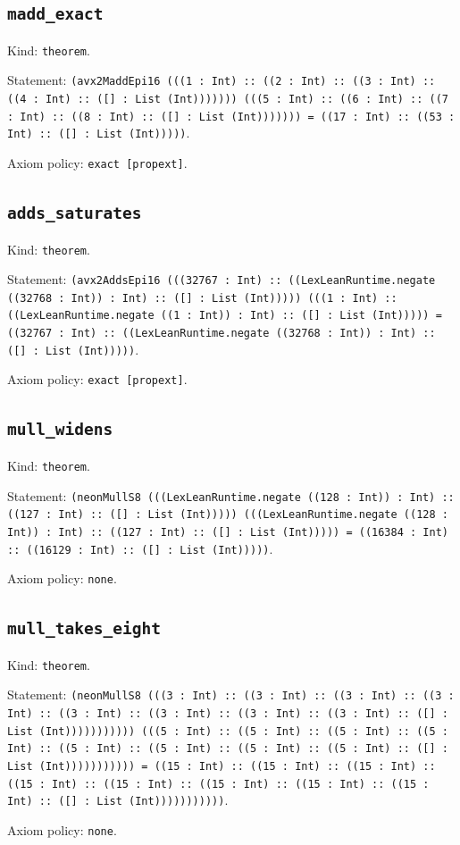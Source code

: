 \documentclass[11pt]{article}
\begin{document}
\subsection*{\texttt{madd\_exact}}
\noindent Kind: \texttt{theorem}.\par
\noindent Statement: \texttt{(avx2MaddEpi16 (((1 : Int) :: ((2 : Int) :: ((3 : Int) :: ((4 : Int) :: ([] : List (Int))))))) (((5 : Int) :: ((6 : Int) :: ((7 : Int) :: ((8 : Int) :: ([] : List (Int))))))) = ((17 : Int) :: ((53 : Int) :: ([] : List (Int)))))}.\par
\noindent Axiom policy: \texttt{exact [propext]}.\par
\subsection*{\texttt{adds\_saturates}}
\noindent Kind: \texttt{theorem}.\par
\noindent Statement: \texttt{(avx2AddsEpi16 (((32767 : Int) :: ((LexLeanRuntime.negate ((32768 : Int)) : Int) :: ([] : List (Int))))) (((1 : Int) :: ((LexLeanRuntime.negate ((1 : Int)) : Int) :: ([] : List (Int))))) = ((32767 : Int) :: ((LexLeanRuntime.negate ((32768 : Int)) : Int) :: ([] : List (Int)))))}.\par
\noindent Axiom policy: \texttt{exact [propext]}.\par
\subsection*{\texttt{mull\_widens}}
\noindent Kind: \texttt{theorem}.\par
\noindent Statement: \texttt{(neonMullS8 (((LexLeanRuntime.negate ((128 : Int)) : Int) :: ((127 : Int) :: ([] : List (Int))))) (((LexLeanRuntime.negate ((128 : Int)) : Int) :: ((127 : Int) :: ([] : List (Int))))) = ((16384 : Int) :: ((16129 : Int) :: ([] : List (Int)))))}.\par
\noindent Axiom policy: \texttt{none}.\par
\subsection*{\texttt{mull\_takes\_eight}}
\noindent Kind: \texttt{theorem}.\par
\noindent Statement: \texttt{(neonMullS8 (((3 : Int) :: ((3 : Int) :: ((3 : Int) :: ((3 : Int) :: ((3 : Int) :: ((3 : Int) :: ((3 : Int) :: ((3 : Int) :: ([] : List (Int))))))))))) (((5 : Int) :: ((5 : Int) :: ((5 : Int) :: ((5 : Int) :: ((5 : Int) :: ((5 : Int) :: ((5 : Int) :: ((5 : Int) :: ([] : List (Int))))))))))) = ((15 : Int) :: ((15 : Int) :: ((15 : Int) :: ((15 : Int) :: ((15 : Int) :: ((15 : Int) :: ((15 : Int) :: ((15 : Int) :: ([] : List (Int)))))))))))}.\par
\noindent Axiom policy: \texttt{none}.\par
\end{document}

